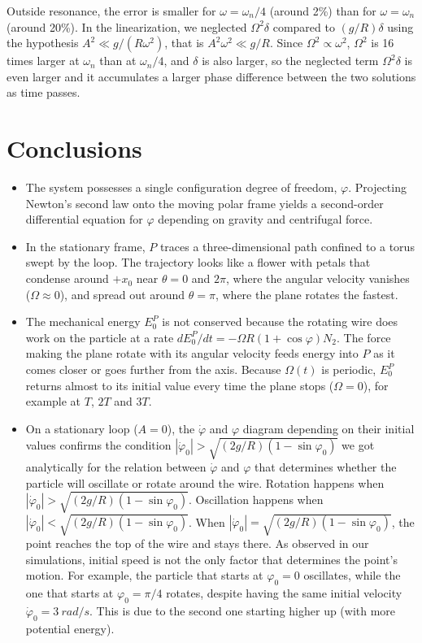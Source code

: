 \documentclass[11pt,a4paper]{article}
\numberwithin{equation}{section}
\newcommand{\dph}{\dot\varphi}
\begin{document}
Outside resonance, the error is smaller for $\omega=\omega_n/4$ (around 2\%) than for $\omega=\omega_n$ (around 20\%). In the linearization, we neglected $\Omega^2\delta$ compared to $(g/R)\delta$ using the hypothesis $A^2\ll g/(R\omega^2)$, that is $A^2\omega^2\ll g/R$. Since $\Omega^2\propto\omega^2$, $\Omega^2$ is 16 times larger at $\omega_n$ than at $\omega_n/4$, and $\delta$ is also larger, so the neglected term $\Omega^2\delta$ is even larger and it accumulates a larger phase difference between the two solutions as time passes.

\section{Conclusions}\label{sec:conc}
\begin{itemize}[noitemsep,topsep=2pt]
\item The system possesses a single configuration degree of freedom, $\varphi$. Projecting Newton's second law onto the moving polar frame yields a second-order differential equation for $\varphi$ depending on gravity and centrifugal force. 

\item In the stationary frame, $P$ traces a three-dimensional path confined to a torus swept by the loop. The trajectory looks like a flower with petals that condense around $+x_0$ near $\theta = 0$ and $2\pi$, where the angular velocity vanishes ($\Omega \approx 0$), and spread out around $\theta = \pi$, where the plane rotates the fastest.

\item The mechanical energy $E_0^P$ is not conserved because the rotating wire does work on the particle at a rate $dE_0^P/dt = -\Omega R(1+\cos\varphi) N_2$. The force making the plane rotate with its angular velocity feeds energy into $P$ as it comes closer or goes further from the axis. Because $\Omega(t)$ is periodic, $E_0^P$ returns almost to its initial value every time the plane stops ($\Omega=0$), for example at $T$, $2T$ and $3T$.

\item On a stationary loop ($A = 0$), the $\dph$ and $\varphi$ diagram depending on their initial values confirms the condition $|\dph_0|> \sqrt{(2g/R)(1-\sin\varphi_0)}$ we got analytically for the relation between $\dph$ and $\varphi$ that determines whether the particle will oscillate or rotate around the wire. Rotation happens when $|\dph_0|> \sqrt{(2g/R)(1-\sin\varphi_0)}$. Oscillation happens when $|\dph_0|< \sqrt{(2g/R)(1-\sin\varphi_0)}$. When $|\dph_0|= \sqrt{(2g/R)(1-\sin\varphi_0)}$, the point reaches the top of the wire and stays there. As observed in our simulations, initial speed is not the only factor that determines the point's motion. For example, the particle that starts at $\varphi_0=0$ oscillates, while the one that starts at $\varphi_0=\pi/4$ rotates, despite having the same initial velocity $\dph_0 = \SI{3}{rad/s}$. This is due to the second one starting higher up (with more potential energy).


\end{itemize}
\end{document}

